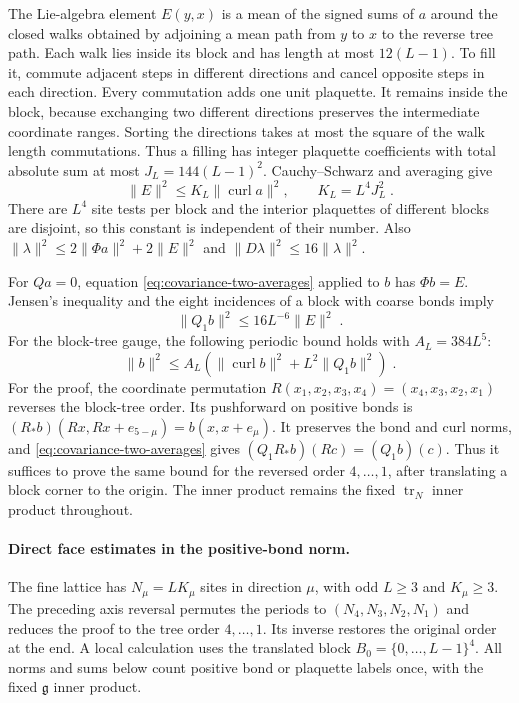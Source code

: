 \documentclass[11pt]{article}
\newcommand{\tr}{\operatorname{tr}}
\begin{document}
The Lie-algebra element $E(y,x)$ is a mean of the signed sums of $a$ around the closed walks obtained by adjoining a mean path from $y$ to $x$ to the reverse tree path. Each walk lies inside its block and has length at most $12(L-1)$. To fill it, commute adjacent steps in different directions and cancel opposite steps in each direction. Every commutation adds one unit plaquette. It remains inside the block, because exchanging two different directions preserves the intermediate coordinate ranges. Sorting the directions takes at most the square of the walk length commutations. Thus a filling has integer plaquette coefficients with total absolute sum at most $J_L=144(L-1)^2$. Cauchy--Schwarz and averaging give
\begin{equation}\label{eq:covariance-filling-bound}
    \|E\|^2\leq K_L\|\operatorname{curl}a\|^2,
    \qquad K_L=L^4J_L^2\;.
\end{equation}
There are $L^4$ site tests per block and the interior plaquettes of different blocks are disjoint, so this constant is independent of their number. Also $\|\lambda\|^2\leq 2\|\Phi a\|^2+2\|E\|^2$ and $\|D\lambda\|^2\leq 16\|\lambda\|^2$.

For $Qa=0$, equation \eqref{eq:covariance-two-averages} applied to $b$ has $\Phi b=E$. Jensen's inequality and the eight incidences of a block with coarse bonds imply
\begin{equation}\label{eq:covariance-constraint-error}
    \|Q_1b\|^2\leq 16L^{-6}\|E\|^2\;.
\end{equation}
For the block-tree gauge, the following periodic bound holds with $A_L=384L^5$:
\begin{equation}\label{eq:covariance-hard-bound}
    \|b\|^2\leq A_L
        (\|\operatorname{curl}b\|^2+L^2\|Q_1b\|^2)\;.
\end{equation}
For the proof, the coordinate permutation $R(x_1,x_2,x_3,x_4)=(x_4,x_3,x_2,x_1)$ reverses the block-tree order. Its pushforward on positive bonds is $(R_*b)(Rx,Rx+e_{5-\mu})=b(x,x+e_\mu)$. It preserves the bond and curl norms, and \eqref{eq:covariance-two-averages} gives $(Q_1R_*b)(Rc)=(Q_1b)(c)$. Thus it suffices to prove the same bound for the reversed order $4,\ldots,1$, after translating a block corner to the origin. The inner product remains the fixed $\tr_N$ inner product throughout.

\paragraph{Direct face estimates in the positive-bond norm.}
The fine lattice has $N_\mu=LK_\mu$ sites in direction $\mu$, with odd $L\geq3$ and $K_\mu\geq3$. The preceding axis reversal permutes the periods to $(N_4,N_3,N_2,N_1)$ and reduces the proof to the tree order $4,\ldots,1$. Its inverse restores the original order at the end. A local calculation uses the translated block $B_0=\{0,\ldots,L-1\}^4$. All norms and sums below count positive bond or plaquette labels once, with the fixed $\mathfrak g$ inner product.
\end{document}

